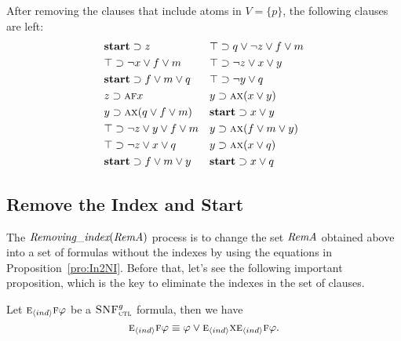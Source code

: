 \documentclass[letterpaper]{article} %
\begin{document}
\begin{example}\label{examp:remA}
After removing the clauses that include atoms in $V=\{p\}$, the following clauses are left:
\begin{align*}
& \textbf{start}\supset z &&  \top \supset q \vee \neg z \vee f \vee m \\
& \top \supset \neg x\vee f \vee m &&  \top \supset \neg z \vee x \vee y \\
&  \textbf{start} \supset f\vee m \vee q &&  \top \supset \neg y \vee q\\
&  z \supset \textsc{a} \textsc{f} x &&   y \supset \textsc{a} \textsc{x}(x\vee y) \\
& y \supset \textsc{a}\textsc{x}(q \vee f\vee m)  && \textbf{start} \supset x \vee y \\
& \top \supset \neg z \vee y \vee f \vee m && y \supset \textsc{a}\textsc{x}(f\vee m\vee y)\\
& \top \supset \neg z \vee x \vee q && y \supset \textsc{a}\textsc{x}(x\vee q) \\
&  \textbf{start} \supset f\vee m \vee y && \textbf{start} \supset x \vee q \\
\end{align*}
\end{example}


\subsection{Remove the Index and Start}
The $\emph{Removing\_index}(\emph{RemA})$ process is to change the set $\emph{RemA}$ obtained above into a set of formulas without the indexes by using the equations in Proposition~\ref{pro:In2NI}. Before that, let's see the following important proposition, which is the key to eliminate the indexes in the set of clauses.
\begin{proposition}\label{pro:Ind:EF}
Let $\textsc{e}_{{\langle{ind}\rangle}} \textsc{f} \varphi$ be a ${\textsc{SNF}_{\textsc{ctl}}^g}$ formula, then we have 
\[
\textsc{e}_{{\langle{ind}\rangle}} \textsc{f} \varphi \equiv \varphi \vee \textsc{e}_{{\langle{ind}\rangle}} \textsc{x} \textsc{e}_{{\langle{ind}\rangle}}\textsc{f} \varphi.
\]
\end{proposition}
\end{document}
